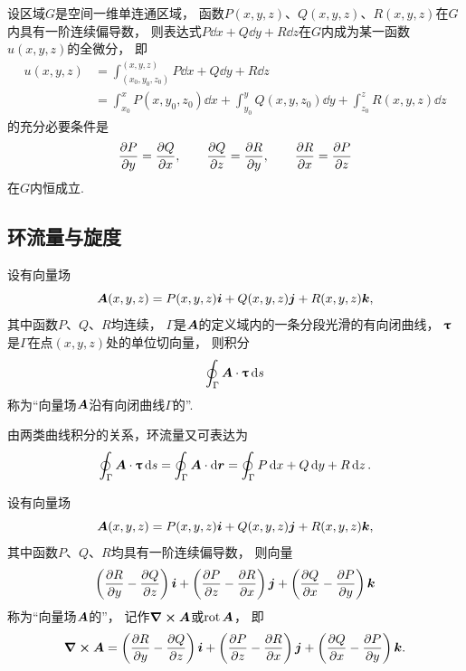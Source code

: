\begin{theorem}\label{theorem:线积分与面积分.与路径无关的空间曲线积分}
设区域\(G\)是空间一维单连通区域，
函数\(P(x,y,z)\)、\(Q(x,y,z)\)、\(R(x,y,z)\)在\(G\)内具有一阶连续偏导数，
则表达式\(P\dd{x}+Q\dd{y}+R\dd{z}\)在\(G\)内成为某一函数\(u(x,y,z)\)的全微分，
即\begin{align*}
	u(x,y,z)
	&= \int_{(x_0,y_0,z_0)}^{(x,y,z)}
	P\dd{x}+Q\dd{y}+R\dd{z} \\
	&= \int_{x_0}^x P(x,y_0,z_0) \dd{x}
	+ \int_{y_0}^y Q(x,y,z_0) \dd{y}
	+ \int_{z_0}^z R(x,y,z) \dd{z}
\end{align*}的充分必要条件是\begin{equation*}
	\pdv{P}{y}=\pdv{Q}{x}, \qquad
	\pdv{Q}{z}=\pdv{R}{y}, \qquad
	\pdv{R}{x}=\pdv{P}{z}
\end{equation*}在\(G\)内恒成立.
\end{theorem}

\subsection{环流量与旋度}
\begin{definition}
设有向量场\begin{equation*}
\boldsymbol{A}(x,y,z)=P(x,y,z)\boldsymbol{i}+Q(x,y,z)\boldsymbol{j}+R(x,y,z)\boldsymbol{k},
\end{equation*}其中函数\(P\)、\(Q\)、\(R\)均连续，
\(\Gamma\)是\(\boldsymbol{A}\)的定义域内的一条分段光滑的有向闭曲线，
\(\boldsymbol{\uptau}\)是\(\Gamma\)在点\((x,y,z)\)处的单位切向量，
则积分\begin{equation*}
	\oint_\Gamma \boldsymbol{A}\cdot\boldsymbol{\uptau} \dd{s}
\end{equation*}称为“向量场\(\boldsymbol{A}\)沿有向闭曲线\(\Gamma\)的”.
\end{definition}
由两类曲线积分的关系，环流量又可表达为\begin{equation*}
	\oint_\Gamma \boldsymbol{A}\cdot\boldsymbol{\uptau} \dd{s}
	=\oint_\Gamma \boldsymbol{A}\cdot\dd{\boldsymbol{r}}
	=\oint_\Gamma P\dd{x}+Q\dd{y}+R\dd{z}.
\end{equation*}

\begin{definition}
设有向量场\begin{equation*}
	\boldsymbol{A}(x,y,z)=P(x,y,z)\boldsymbol{i}+Q(x,y,z)\boldsymbol{j}+R(x,y,z)\boldsymbol{k},
\end{equation*}
其中函数\(P\)、\(Q\)、\(R\)均具有一阶连续偏导数，
则向量\begin{equation*}
	\left( \pdv{R}{y} - \pdv{Q}{z} \right)\boldsymbol{i}
	+\left( \pdv{P}{z} - \pdv{R}{x} \right)\boldsymbol{j}
	+\left( \pdv{Q}{x} - \pdv{P}{y} \right)\boldsymbol{k}
\end{equation*}
称为“向量场\(\boldsymbol{A}\)的”，
记作\(\curl{\boldsymbol{A}}\)或\(\operatorname{rot}\boldsymbol{A}\)，
即\begin{equation*}
	\curl{\boldsymbol{A}}
	=\left( \pdv{R}{y} - \pdv{Q}{z} \right)\boldsymbol{i}
	+\left( \pdv{P}{z} - \pdv{R}{x} \right)\boldsymbol{j}
	+\left( \pdv{Q}{x} - \pdv{P}{y} \right)\boldsymbol{k}.
\end{equation*}
\end{definition}

